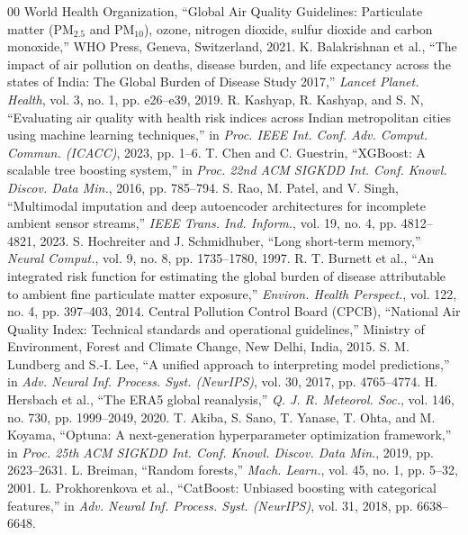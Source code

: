 \documentclass[conference]{IEEEtran}
\begin{document}
\begin{thebibliography}{00}
 World Health Organization, ``Global Air Quality Guidelines: Particulate matter ($\text{PM}_{2.5}$ and $\text{PM}_{10}$), ozone, nitrogen dioxide, sulfur dioxide and carbon monoxide,'' WHO Press, Geneva, Switzerland, 2021.
 K. Balakrishnan et al., ``The impact of air pollution on deaths, disease burden, and life expectancy across the states of India: The Global Burden of Disease Study 2017,'' \textit{Lancet Planet. Health}, vol. 3, no. 1, pp. e26--e39, 2019.
 R. Kashyap, R. Kashyap, and S. N, ``Evaluating air quality with health risk indices across Indian metropolitan cities using machine learning techniques,'' in \textit{Proc. IEEE Int. Conf. Adv. Comput. Commun. (ICACC)}, 2023, pp. 1--6.
 T. Chen and C. Guestrin, ``XGBoost: A scalable tree boosting system,'' in \textit{Proc. 22nd ACM SIGKDD Int. Conf. Knowl. Discov. Data Min.}, 2016, pp. 785--794.
 S. Rao, M. Patel, and V. Singh, ``Multimodal imputation and deep autoencoder architectures for incomplete ambient sensor streams,'' \textit{IEEE Trans. Ind. Inform.}, vol. 19, no. 4, pp. 4812--4821, 2023.
 S. Hochreiter and J. Schmidhuber, ``Long short-term memory,'' \textit{Neural Comput.}, vol. 9, no. 8, pp. 1735--1780, 1997.
 R. T. Burnett et al., ``An integrated risk function for estimating the global burden of disease attributable to ambient fine particulate matter exposure,'' \textit{Environ. Health Perspect.}, vol. 122, no. 4, pp. 397--403, 2014.
 Central Pollution Control Board (CPCB), ``National Air Quality Index: Technical standards and operational guidelines,'' Ministry of Environment, Forest and Climate Change, New Delhi, India, 2015.
 S. M. Lundberg and S.-I. Lee, ``A unified approach to interpreting model predictions,'' in \textit{Adv. Neural Inf. Process. Syst. (NeurIPS)}, vol. 30, 2017, pp. 4765--4774.
 H. Hersbach et al., ``The ERA5 global reanalysis,'' \textit{Q. J. R. Meteorol. Soc.}, vol. 146, no. 730, pp. 1999--2049, 2020.
 T. Akiba, S. Sano, T. Yanase, T. Ohta, and M. Koyama, ``Optuna: A next-generation hyperparameter optimization framework,'' in \textit{Proc. 25th ACM SIGKDD Int. Conf. Knowl. Discov. Data Min.}, 2019, pp. 2623--2631.
 L. Breiman, ``Random forests,'' \textit{Mach. Learn.}, vol. 45, no. 1, pp. 5--32, 2001.
 L. Prokhorenkova et al., ``CatBoost: Unbiased boosting with categorical features,'' in \textit{Adv. Neural Inf. Process. Syst. (NeurIPS)}, vol. 31, 2018, pp. 6638--6648.

\end{thebibliography}
\end{document}
